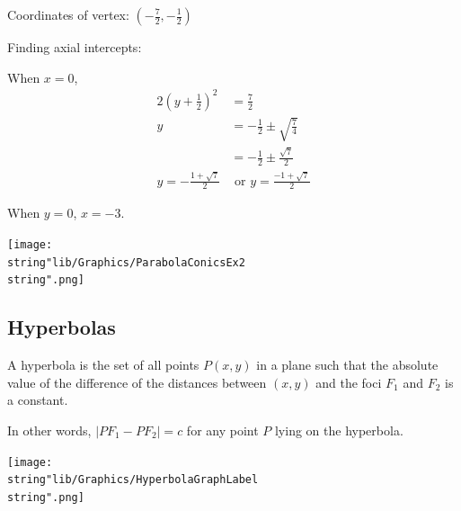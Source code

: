 \documentclass[11pt,a4paper]{book}
\begin{document}
\begin{example}{}
\begin{enumerate}[label=(\alph*)]
\begin{minipage}[t]{0.5\textwidth}
Coordinates of vertex: ${\displaystyle \left(-\frac{7}{2},-\frac{1}{2}\right)}$

Finding axial intercepts:

When $x=0$,
\begin{align*}
2\left(y+\frac{1}{2}\right)^{2} & =\frac{7}{2}\\
y & =-\frac{1}{2}\pm\sqrt{\frac{7}{4}}\\
 & =-\frac{1}{2}\pm\frac{\sqrt{7}}{2}\\
y=-\frac{1+\sqrt{7}}{2} & \text{ or }y=\frac{-1+\sqrt{7}}{2}
\end{align*}

When $y=0$, $x=-3$.


\end{minipage}
\begin{minipage}[t]{0.5\textwidth}

\vspace{3cm}


\begin{center}
\texttt{[image: \\string"lib/Graphics/ParabolaConicsEx2\\string".png]}
\par\end{center}



\end{minipage}

\end{enumerate}
\end{example}

\newpage

\subsection{Hyperbolas}

A hyperbola is the set of all points $P(x,y)$ in a plane such that
the absolute value of the difference of the distances between $(x,y)$
and the foci $F_{1}$ and $F_{2}$ is a constant.

\begin{minipage}[t]{0.6\textwidth}

In other words, $\left|PF_{1}-PF_{2}\right|=c$ for any point $P$
lying on the hyperbola.
\end{minipage}
\begin{minipage}{0.4\textwidth}
\begin{center}
\texttt{[image: \\string"lib/Graphics/HyperbolaGraphLabel\\string".png]}
\par\end{center}
\end{minipage}
\end{document}
